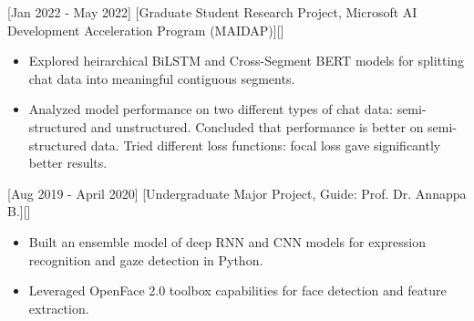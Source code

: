 \documentclass{article}
\begin{document}
[Jan 2022 - May 2022]
[Graduate Student Research Project, Microsoft AI Development Acceleration Program (MAIDAP)][]
\begin{itemize}
\item Explored heirarchical BiLSTM and Cross-Segment BERT models for splitting chat data into meaningful contiguous segments.
\item Analyzed model performance on two different types of chat data: semi-structured and unstructured. Concluded that performance is better on semi-structured data. Tried different loss functions: focal loss gave significantly better results.
\end{itemize}

[Aug 2019 - April 2020]
[Undergraduate Major Project, Guide: Prof. Dr. Annappa B.][]
\begin{itemize}
\item Built an ensemble model of deep RNN and CNN models for expression recognition and gaze detection in Python.
\item Leveraged OpenFace 2.0 toolbox capabilities for face detection and feature extraction.
\end{itemize}


\end{document}
